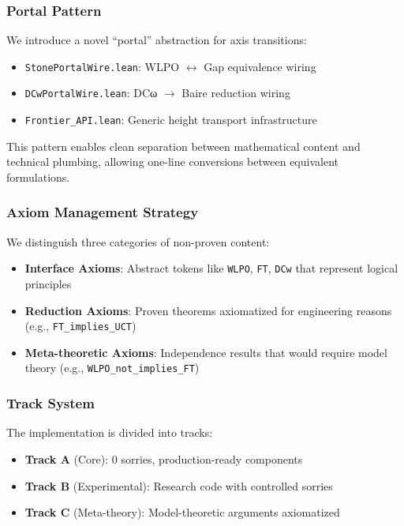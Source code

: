 \documentclass[11pt]{article}
\theoremstyle{plain}
\theoremstyle{definition}
\begin{document}
\subsubsection{Portal Pattern}

We introduce a novel ``portal'' abstraction for axis transitions:
\begin{itemize}
\item \texttt{StonePortalWire.lean}: WLPO $\leftrightarrow$ Gap equivalence wiring
\item \texttt{DCwPortalWire.lean}: DCω $\rightarrow$ Baire reduction wiring
\item \texttt{Frontier\_API.lean}: Generic height transport infrastructure
\end{itemize}

This pattern enables clean separation between mathematical content and technical plumbing, allowing one-line conversions between equivalent formulations.

\subsubsection{Axiom Management Strategy}

We distinguish three categories of non-proven content:
\begin{itemize}
\item \textbf{Interface Axioms}: Abstract tokens like \texttt{WLPO}, \texttt{FT}, \texttt{DCw} that represent logical principles
\item \textbf{Reduction Axioms}: Proven theorems axiomatized for engineering reasons (e.g., \texttt{FT\_implies\_UCT})
\item \textbf{Meta-theoretic Axioms}: Independence results that would require model theory (e.g., \texttt{WLPO\_not\_implies\_FT})
\end{itemize}

\subsubsection{Track System}

The implementation is divided into tracks:
\begin{itemize}
\item \textbf{Track A} (Core): 0 sorries, production-ready components
\item \textbf{Track B} (Experimental): Research code with controlled sorries
\item \textbf{Track C} (Meta-theory): Model-theoretic arguments axiomatized
\end{itemize}
\end{document}
